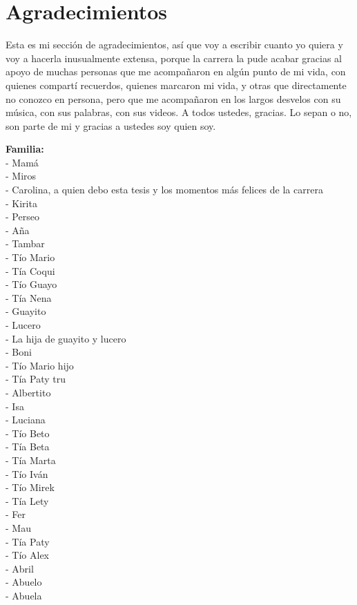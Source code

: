 \chapter{Agradecimientos}
Esta es mi sección de agradecimientos, así que voy a escribir cuanto yo quiera y voy a hacerla inusualmente extensa, porque la carrera la pude acabar gracias al apoyo de muchas personas que me acompañaron en algún punto de mi vida, con quienes compartí recuerdos, quienes marcaron mi vida, y otras que directamente no conozco en persona, pero que me acompañaron en los largos desvelos con su música, con sus palabras, con sus videos. A todos ustedes, gracias. Lo sepan o no, son parte de mi y gracias a ustedes soy quien soy. 

\textbf{Familia:}\\
- Mamá\\
- Miros\\
- Carolina, a quien debo esta tesis y los momentos más felices de la carrera \\
- Kirita\\
- Perseo\\
- Aña\\
- Tambar\\
- Tío Mario\\
- Tía Coqui\\
- Tío Guayo\\
- Tía Nena\\
- Guayito\\
- Lucero\\
- La hija de guayito y lucero\\
- Boni\\
- Tío Mario hijo\\
- Tía Paty tru\\
- Albertito\\
- Isa\\
- Luciana\\
- Tío Beto\\
- Tía Beta\\
- Tía Marta\\
- Tío Iván\\
- Tío Mirek\\
- Tía Lety\\
- Fer\\
- Mau\\
- Tía Paty\\
- Tío Alex\\
- Abril\\
- Abuelo\\
- Abuela\\

